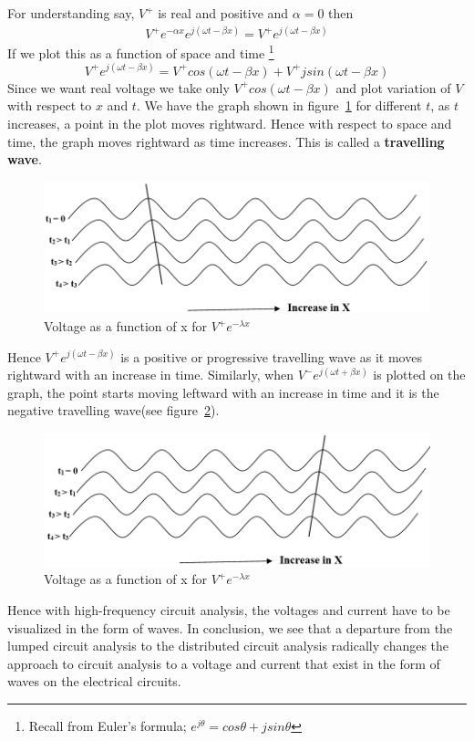 For understanding say, $  V^{+} $ is real and positive and $ \alpha= 0 $ then
\begin{align*}
V^{+}e^{-\alpha x}e^{j( \omega t-\beta x)} = V^{+} e^{j( \omega t-\beta x)}
\end{align*}
If we plot this as a function of space and time
\footnote{Recall from Euler's formula; $ e^{j\theta} = cos\theta + jsin\theta $}
\begin{equation*}
V^{+}e^{j( \omega t-\beta x)} = V^{+}cos(\omega t- \beta x) +  V^{+}jsin(\omega t- \beta x)
\end{equation*}
Since we want real voltage we take only $ V^{+}cos(\omega t- \beta x) $ and plot variation of $ V $ with respect to $ x $ and $ t $. We have the graph shown in figure~\ref{fig:abc} for different $ t $, as $ t $ increases, a point in the plot moves rightward. Hence with respect to space and time, the graph moves rightward as time increases. This is called a \textbf{travelling wave}.
\begin{figure}[h]
\centering
\includegraphics[width=1\linewidth]{./graphics/ABC}
\caption{Voltage as a function of x for $V^+e^{-\lambda x}$}
\label{fig:abc}
\end{figure}

Hence  $ V^{+}e^{j(\omega t- \beta x )} $ is a positive or progressive travelling wave as it moves rightward with an increase in time. Similarly, when $ V^{-}e^{j( \omega t+ \beta x )} $ is plotted on the graph, the point starts moving leftward with an increase in time and it is the negative travelling wave(see figure~\ref{fig:abcd}).
\begin{figure}[h]
\centering
\includegraphics[width=1\linewidth]{./graphics/ABCD}
\caption{Voltage as a function of x for $V^+e^{-\lambda x}$}
\label{fig:abcd}
\end{figure}

Hence with high-frequency circuit analysis, the voltages and current have to be visualized in the form of waves. In conclusion, we see that a departure from the lumped circuit analysis to the distributed circuit analysis radically changes the approach to circuit analysis to a voltage and current that exist in the form of waves on the electrical circuits. 